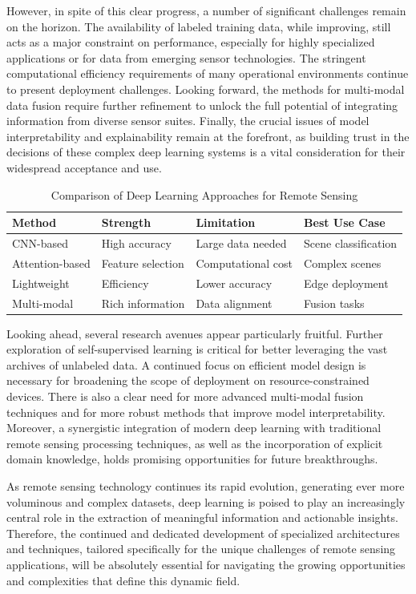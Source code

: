 \documentclass[12pt,a4paper]{article}
\begin{document}
However, in spite of this clear progress, a number of significant challenges remain on the horizon. The availability of labeled training data, while improving, still acts as a major constraint on performance, especially for highly specialized applications or for data from emerging sensor technologies. The stringent computational efficiency requirements of many operational environments continue to present deployment challenges. Looking forward, the methods for multi-modal data fusion require further refinement to unlock the full potential of integrating information from diverse sensor suites. Finally, the crucial issues of model interpretability and explainability remain at the forefront, as building trust in the decisions of these complex deep learning systems is a vital consideration for their widespread acceptance and use.

\begin{table}[htbp]
\centering
\caption{Comparison of Deep Learning Approaches for Remote Sensing}
\label{tab:comparison}
\begin{tabular}{@{}llll@{}}
\toprule
\textbf{Method} & \textbf{Strength} & \textbf{Limitation} & \textbf{Best Use Case} \\ 
\midrule
CNN-based & High accuracy & Large data needed & Scene classification \\
Attention-based & Feature selection & Computational cost & Complex scenes \\
Lightweight & Efficiency & Lower accuracy & Edge deployment \\
Multi-modal & Rich information & Data alignment & Fusion tasks \\
\bottomrule
\end{tabular}
\end{table}

Looking ahead, several research avenues appear particularly fruitful. Further exploration of self-supervised learning is critical for better leveraging the vast archives of unlabeled data. A continued focus on efficient model design is necessary for broadening the scope of deployment on resource-constrained devices. There is also a clear need for more advanced multi-modal fusion techniques and for more robust methods that improve model interpretability. Moreover, a synergistic integration of modern deep learning with traditional remote sensing processing techniques, as well as the incorporation of explicit domain knowledge, holds promising opportunities for future breakthroughs.

As remote sensing technology continues its rapid evolution, generating ever more voluminous and complex datasets, deep learning is poised to play an increasingly central role in the extraction of meaningful information and actionable insights. Therefore, the continued and dedicated development of specialized architectures and techniques, tailored specifically for the unique challenges of remote sensing applications, will be absolutely essential for navigating the growing opportunities and complexities that define this dynamic field.
\end{document}
